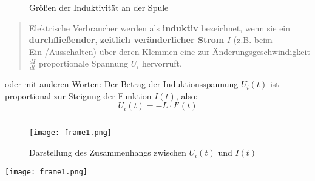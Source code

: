 \begin{frame}
    \makeframetitle
    \begin{figure}
        \begin{center}
            
        \end{center}
        \caption{Größen der Induktivität an der Spule\cite{fuafev_image}}
    \end{figure}
\end{frame}

\begin{frame}
    \makeframetitle
    \begin{quote}
        Elektrische Verbraucher werden als \textbf{induktiv} bezeichnet, wenn
        sie ein \textbf{durchfließender}, \textbf{zeitlich
        \alert{veränderlicher} Strom} $I$ (z.B. beim Ein-/Ausschalten) über deren
        Klemmen eine zur Änderungsgeschwindigkeit $\frac{dI}{dt}$ proportionale
        Spannung $U_i$ hervorruft.
    \end{quote}
    \vspace{1cm}
    \pause
    \begin{block}{oder mit anderen Worten:}
        Der Betrag der Induktionsspannung $U_{i}(t)$ ist
        proportional zur Steigung der Funktion $I(t)$, also:
        \[
            U_i(t) = -L \cdot I'(t)
        \]
    \end{block}
\end{frame}

\begin{frame}
    \makeframetitle
    \begin{figure}
        \centering
        \begin{columns}
                \texttt{[image: frame1.png]}
                \caption{Darstellung des Zusammenhangs zwischen $U_{i}(t)$ und
                $I(t)$\cite{leifi_induktion_funktionen}}
        \end{columns}
    \end{figure}
\end{frame}

\begin{frame}
    \centering
    \texttt{[image: frame1.png]}
\end{frame}

